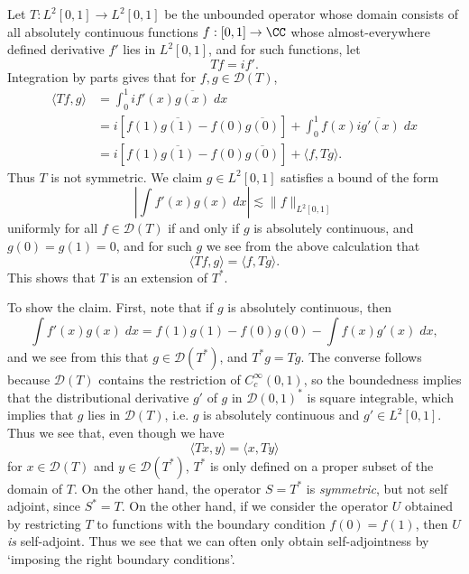 \begin{example}
    Let $T: L^2[0,1] \to L^2[0,1]$ be the unbounded operator whose domain consists of all absolutely continuous functions $f: [0,1] \to \CC$ whose almost-everywhere defined derivative $f'$ lies in $L^2[0,1]$, and for such functions, let
    \[ Tf = if'. \]
    Integration by parts gives that for $f,g \in \mathcal{D}(T)$,
    \begin{align*}
        \langle Tf, g \rangle &= \int_0^1 if'(x) \overline{g(x)}\; dx\\
        &= i [ f(1) \overline{g(1)} - f(0) \overline{g(0)} ] + \int_0^1 f(x) \overline{i g'(x)}\; dx\\
        &= i [ f(1) \overline{g(1)} - f(0) \overline{g(0)} ] + \langle f, Tg \rangle.
    \end{align*}
    Thus $T$ is not symmetric. We claim $g \in L^2[0,1]$ satisfies a bound of the form
    \[ \left| \int f'(x) g(x)\; dx \right| \lesssim \| f \|_{L^2[0,1]} \]
    uniformly for all $f \in \mathcal{D}(T)$ if and only if $g$ is absolutely continuous, and $g(0) = g(1) = 0$, and for such $g$ we see from the above calculation that
    \[ \langle Tf, g \rangle = \langle f, Tg \rangle. \]
    This shows that $T$ is an extension of $T^*$.

    To show the claim. First, note that if $g$ is absolutely continuous, then
    \[ \int f'(x) g(x)\; dx = f(1) g(1) - f(0) g(0) - \int f(x) g'(x)\; dx, \]
    and we see from this that $g \in \mathcal{D}(T^*)$, and $T^*g = Tg$. The converse follows because $\mathcal{D}(T)$ contains the restriction of $C_c^\infty(0,1)$, so the boundedness implies that the distributional derivative $g'$ of $g$ in $\mathcal{D}(0,1)^*$ is square integrable, which implies that $g$ lies in $\mathcal{D}(T)$, i.e. $g$ is absolutely continuous and $g' \in L^2[0,1]$. Thus we see that, even though we have
    \[ \langle Tx, y \rangle = \langle x, Ty \rangle \]
    for $x \in \mathcal{D}(T)$ and $y \in \mathcal{D}(T^*)$, $T^*$ is only defined on a proper subset of the domain of $T$. On the other hand, the operator $ S = T^*$ is \emph{symmetric}, but not self adjoint, since $S^* = T$. On the other hand, if we consider the operator $U$ obtained by restricting $T$ to functions with the boundary condition $f(0) = f(1)$, then $U$ \emph{is} self-adjoint. Thus we see that we can often only obtain self-adjointness by `imposing the right boundary conditions'.
\end{example}

